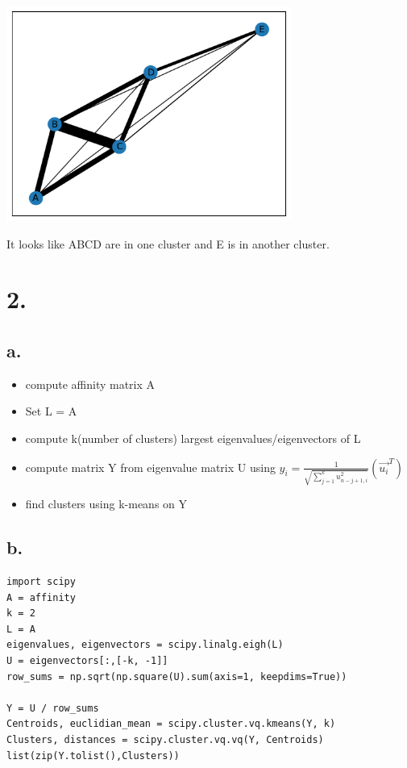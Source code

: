\documentclass[11pt]{article}
\begin{document}
\begin{center}
\includegraphics[width=0.7\textwidth]{./.ob-jupyter/b9ae460d0829f20394bc4a381df69a095b43ed4b.png}
\end{center}

It looks like ABCD are in one cluster and E is in another cluster.
\section*{2.}
\label{sec:org570cf3a}
\subsection*{a.}
\label{sec:orgfc64e8a}
\begin{itemize}
\item compute affinity matrix A
\item Set L = A
\item compute k(number of clusters) largest eigenvalues/eigenvectors of L
\item compute matrix Y from eigenvalue matrix U using \(y_i =
  \frac{1}{\sqrt{\sum^k_{j=1}u^2_{n-j+1, i}}}(\vec{u_i}^T)\)
\item find clusters using k-means on Y
\end{itemize}
\subsection*{b.}
\label{sec:org257de71}
\begin{verbatim}
import scipy
A = affinity
k = 2
L = A
eigenvalues, eigenvectors = scipy.linalg.eigh(L)
U = eigenvectors[:,[-k, -1]]
row_sums = np.sqrt(np.square(U).sum(axis=1, keepdims=True))

Y = U / row_sums
Centroids, euclidian_mean = scipy.cluster.vq.kmeans(Y, k)
Clusters, distances = scipy.cluster.vq.vq(Y, Centroids)
list(zip(Y.tolist(),Clusters))
\end{verbatim}
\end{document}
